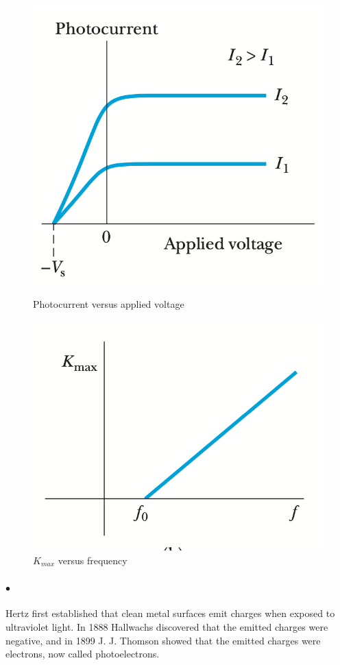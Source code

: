 \documentclass[a4paper]{report}
\begin{document}
            \begin{figure}
                \includegraphics[width=0.9\linewidth]{figures/photocurrent versus applied voltage.png}
                \caption{Photocurrent versus applied voltage}
                \label{fig:Photocurrent versus applied voltage}
                \includegraphics[width=0.9\linewidth]{figures/Kmax.png}
                \caption{$K_{max}$ versus frequency}
                \label{fig:Kmax versus frequency}
            \end{figure}

            \paragraph{$\bullet$} Hertz first established that clean metal surfaces emit charges when exposed to 
            ultraviolet light. In 1888 Hallwachs discovered that the emitted charges were negative, 
            and in 1899 J. J. Thomson showed that the emitted charges were electrons, now called photoelectrons.
\end{document}
